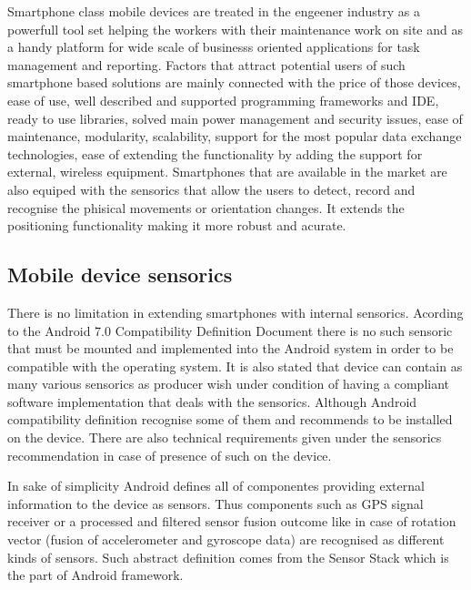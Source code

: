 \documentclass[../main.tex]{subfiles}
\begin{document}
Smartphone class mobile devices are treated in the engeener industry as a powerfull tool set helping the workers with their maintenance work on site and as a handy platform for wide scale of businesss oriented applications for task management and reporting. Factors that attract potential users of such smartphone based solutions are mainly connected with the price of those devices, ease of use, well described and supported programming frameworks and IDE, ready to use libraries, solved main power management and security issues, ease of maintenance, modularity, scalability, support for the most popular data exchange technologies, ease of extending the functionality by adding the support for external, wireless equipment. Smartphones that are available in the market are also equiped with the sensorics that allow the users to detect, record and recognise the phisical movements or orientation changes. It extends the positioning functionality making it more robust and acurate\cite{article_Inertial-sensors-for-smartphones}\cite{article_inertial_test_smartphone}.

\subsection{Mobile device sensorics}

There is no limitation in extending smartphones with internal sensorics. Acording to the Android 7.0 Compatibility Definition Document\cite{android7.0_cdd} there is no such sensoric that must be mounted and implemented into the Android system in order to be compatible with the operating system. It is also stated that device can contain as many various sensorics as producer wish under condition of having a compliant software implementation that deals with the sensorics. Although Android compatibility definition recognise some of them and recommends to be installed on the device. There are also technical requirements given under the sensorics recommendation in case of presence of such on the device.

In sake of simplicity Android defines all of componentes providing external information to the device as sensors. Thus components such as GPS signal receiver or a processed and filtered sensor fusion outcome like in case of rotation vector (fusion of accelerometer and gyroscope data) are recognised as different kinds of sensors. Such abstract definition comes from the Sensor Stack which is the part of Android framework.
\end{document}
